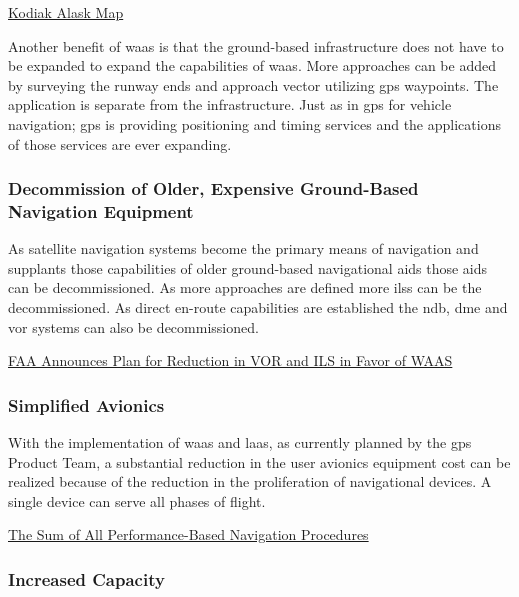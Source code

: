 \href{https://www.google.com/maps/@57.7483115,-152.5265434,13z/data=!4m3!11m2!2s1o5YgbCjAjyBntt5HWecW-6ByCvg!3e3!5m1!1e4}{Kodiak
Alask Map}

Another benefit of \ac{waas} is that the ground-based infrastructure does not
have to be expanded to expand the capabilities of \ac{waas}. More approaches
can be added by surveying the runway ends and approach vector utilizing
\ac{gps} waypoints. The application is separate from the infrastructure. Just
as in \ac{gps} for vehicle navigation; \ac{gps} is providing positioning and
timing services and the applications of those services are ever
expanding.

\subsubsection{Decommission of Older, Expensive Ground-Based Navigation
Equipment}\label{decommission-of-older-expensive-ground-based-navigation-equipment}

As satellite navigation systems become the primary means of navigation
and supplants those capabilities of older ground-based navigational aids
those aids can be decommissioned. As more approaches are defined more
\acp{ils} can be the decommissioned. As direct en-route capabilities are
established the \ac{ndb}, \ac{dme} and \ac{vor} systems can also be decommissioned.

\href{https://www.uasc.com/docs/default-source/documents/universalflyer/uasc_universalflyer_20122q.pdf?sfvrsn=e717985c_2}{FAA
Announces Plan for Reduction in VOR and ILS in Favor of WAAS}

\subsubsection{Simplified Avionics}\label{simplified-avionics}

With the implementation of \ac{waas} and \ac{laas}, as currently planned by the \ac{gps} Product Team, a substantial reduction in the user avionics equipment cost can be realized because of the reduction in the proliferation of navigational devices. A single device can serve all phases of flight.

\href{https://www.faa.gov/about/office_org/headquarters_offices/ato/service_units/techops/navservices/gnss/library/satnav/media/SatNavNews_Summer_2017.pdf}{The
Sum of All Performance-Based Navigation Procedures}

\subsubsection{Increased Capacity}\label{increased-capacity}

